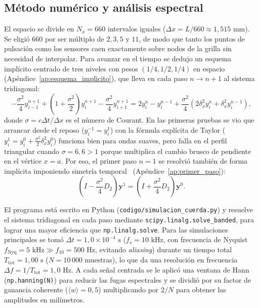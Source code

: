 \documentclass[11pt,a4paper]{article}
\begin{document}
\subsection{Método numérico y análisis espectral}

El espacio se divide en $N_x = 660$ intervalos iguales ($\Delta x = L/660 \approx 1{,}515\text{ mm}$). Se eligió $660$ por ser múltiplo de $2, 3, 5$ y $11$, de modo que tanto los puntos de pulsación como los sensores caen exactamente sobre nodos de la grilla sin necesidad de interpolar. Para avanzar en el tiempo se dedujo un esquema implícito centrado de tres niveles con pesos $(1/4, 1/2, 1/4)$ en espacio (Apéndice~\ref{ap:esquema_implicito}), que lleva en cada paso $n \to n+1$ al sistema tridiagonal:
\begin{equation}
-\frac{\sigma^2}{4} y_{i-1}^{n+1} + \left(1 + \frac{\sigma^2}{2}\right) y_i^{n+1} - \frac{\sigma^2}{4} y_{i+1}^{n+1} = 2y_i^n - y_i^{n-1} + \frac{\sigma^2}{4}\left(2\delta_x^2 y_i^n + \delta_x^2 y_i^{n-1}\right),
\label{eq:esquema_cuerpo}
\end{equation}
donde $\sigma = c\Delta t/\Delta x$ es el número de Courant. En las primeras pruebas se vio que arrancar desde el reposo ($y_i^{-1} = y_i^1$) con la fórmula explícita de Taylor ($y_i^1 = y_i^0 + \frac{\sigma^2}{2}\delta_x^2 y_i^0$) funciona bien para ondas suaves, pero falla en el perfil triangular cuando $\sigma = 6{,}6 > 1$ porque multiplica el cambio brusco de pendiente en el vértice $x = a$. Por eso, el primer paso $n = 1$ se resolvió también de forma implícita imponiendo simetría temporal~\cite{gutierrez} (Apéndice~\ref{ap:primer_paso}):
\begin{equation}
\left(I - \frac{\sigma^2}{4} D_2\right)\mathbf{y}^1 = \left(I + \frac{\sigma^2}{4} D_2\right)\mathbf{y}^0.
\label{eq:arranque_cuerpo}
\end{equation}

El programa está escrito en Python (\texttt{codigo/simulacion\_cuerda.py}) y resuelve el sistema tridiagonal en cada paso mediante \texttt{scipy.linalg.solve\_banded}, para lograr una mayor eficiencia que \texttt{np.linalg.solve}. Para las simulaciones principales se tomó $\Delta t = 1{,}0 \times 10^{-4}\text{ s}$ ($f_s = 10\text{ kHz}$, con frecuencia de Nyquist $f_{\text{Nyq}} = 5\text{ kHz} \gg f_{10} = 500\text{ Hz}$, evitando \textit{aliasing}) durante un tiempo total $T_{\text{tot}} = 1{,}00\text{ s}$ ($N = 10\,000$ muestras), lo que da una resolución en frecuencia $\Delta f = 1/T_{\text{tot}} = 1{,}0\text{ Hz}$. A cada señal centrada se le aplicó una ventana de Hann (\texttt{np.hanning(N)}) para reducir las fugas espectrales y se dividió por su factor de ganancia coherente ($\langle w \rangle = 0{,}5$) multiplicando por $2/N$ para obtener las amplitudes en milímetros.
\end{document}
